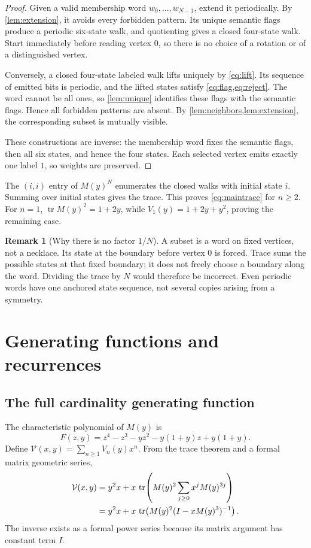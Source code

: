 \documentclass[11pt,a4paper]{article}
\theoremstyle{definition}
\newtheorem{remark}[theorem]{Remark}
\newcommand{\tr}{\operatorname{tr}}
\newcommand{\V}{\mathcal V}
\begin{document}
\begin{proof}
Given a valid membership word $w_0,\ldots,w_{N-1}$, extend it periodically.
By \cref{lem:extension}, it avoids every forbidden pattern. Its unique
semantic flags produce a periodic six-state walk, and quotienting gives a
closed four-state walk. Start immediately before reading vertex $0$, so
there is no choice of a rotation or of a distinguished vertex.

Conversely, a closed four-state labeled walk lifts uniquely by
\cref{eq:lift}. Its sequence of emitted bits is periodic, and the lifted
states satisfy \cref{eq:flag,eq:reject}. The word cannot be all ones, so
\cref{lem:unique} identifies these flags with the semantic flags. Hence
all forbidden patterns are absent. By \cref{lem:neighbors,lem:extension},
the corresponding subset is mutually visible.

These constructions are inverse: the membership word fixes the semantic
flags, then all six states, and hence the four states. Each selected vertex
emits exactly one label $1$, so weights are preserved.
\end{proof}

The $(i,i)$ entry of $M(y)^N$ enumerates the closed walks with initial state
$i$. Summing over initial states gives the trace. This proves
\cref{eq:maintrace} for $n\ge2$. For $n=1$,
$\tr M(y)^2=1+2y$, while $V_1(y)=1+2y+y^2$, proving the remaining case.

\begin{remark}[Why there is no factor $1/N$]
A subset is a word on fixed vertices, not a necklace. Its state at the
boundary before vertex $0$ is forced. Trace sums the possible states at that
fixed boundary; it does not freely choose a boundary along the word.
Dividing the trace by $N$ would therefore be incorrect. Even periodic words
have one anchored state sequence, not several copies arising from a
symmetry.
\end{remark}

\section{Generating functions and recurrences}
\label{sec:gf}

\subsection{The full cardinality generating function}

The characteristic polynomial of $M(y)$ is
\begin{equation}
 F(z,y)=z^4-z^3-yz^2-y(1+y)z+y(1+y).
 \label{eq:char}
\end{equation}
Define $\V(x,y)=\sum_{n\ge1}V_n(y)x^n$. From the trace theorem and a formal
matrix geometric series,
\begin{align}
 \V(x,y)
 &=y^2x+x\,\tr\!\left(M(y)^2\sum_{j\ge0}x^jM(y)^{3j}\right)\notag\\
 &=y^2x+x\,\tr\!\left(M(y)^2(I-xM(y)^3)^{-1}\right).
 \label{eq:resolvent}
\end{align}
The inverse exists as a formal power series because its matrix argument has
constant term $I$.
\end{document}
